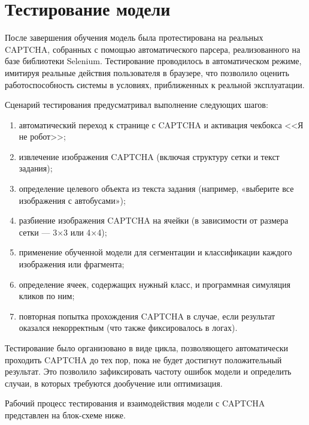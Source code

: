 \section{Тестирование модели}

После завершения обучения модель была протестирована на реальных CAPTCHA, собранных с помощью автоматического парсера, реализованного на базе библиотеки Selenium. Тестирование проводилось в автоматическом режиме, имитируя реальные действия пользователя в браузере, что позволило оценить работоспособность системы в условиях, приближенных к реальной эксплуатации.

Сценарий тестирования предусматривал выполнение следующих шагов:

\begin{enumerate}
    \item автоматический переход к странице с CAPTCHA и активация чекбокса <<Я не робот>>;
    \item извлечение изображения CAPTCHA (включая структуру сетки и текст задания);
    \item определение целевого объекта из текста задания (например, «выберите все изображения с автобусами»);
    \item разбиение изображения CAPTCHA на ячейки (в зависимости от размера сетки — 3×3 или 4×4);
    \item применение обученной модели для сегментации и классификации каждого изображения или фрагмента;
    \item определение ячеек, содержащих нужный класс, и программная симуляция кликов по ним;
    \item повторная попытка прохождения CAPTCHA в случае, если результат оказался некорректным (что также фиксировалось в логах).
\end{enumerate}

Тестирование было организовано в виде цикла, позволяющего автоматически проходить CAPTCHA до тех пор, пока не будет достигнут положительный результат. Это позволило зафиксировать частоту ошибок модели и определить случаи, в которых требуются дообучение или оптимизация.

Рабочий процесс тестирования и взаимодействия модели с CAPTCHA представлен на блок-схеме ниже.

